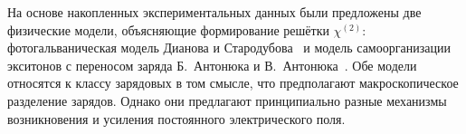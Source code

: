 На основе накопленных экспериментальных данных были предложены две физические модели, объясняющие формирование решётки $\chi^{(2)}$: фотогальваническая модель Дианова и Стародубова~\cite{dianov1995photoinduced} и модель самоорганизации экситонов с переносом заряда Б.~Антонюка и В.~Антонюка~\cite{antonyuk2001self}. Обе модели относятся к классу зарядовых в том смысле, что предполагают макроскопическое разделение зарядов. Однако они предлагают принципиально разные механизмы возникновения и усиления постоянного электрического поля.
